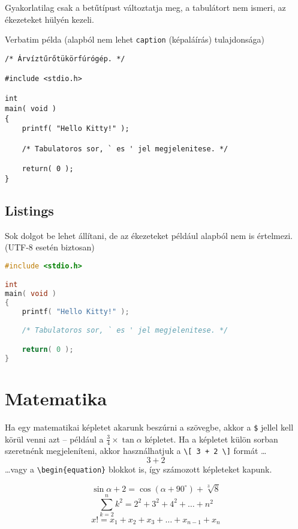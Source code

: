 \documentclass[a4paper]{report}             %
\begin{document}
Gyakorlatilag csak a betűtípust változtatja meg, a tabulátort nem ismeri, az
ékezeteket hülyén kezeli.

Verbatim példa (alapból nem lehet \verb"caption" (képaláírás) tulajdonsága)

\begin{verbatim}
/* Árvíztűrőtükörfúrógép. */

#include <stdio.h>

int
main( void )
{
    printf( "Hello Kitty!" );

	/* Tabulatoros sor, ` es ' jel megjelenitese. */

    return( 0 );
}
\end{verbatim}


\subsection{Listings}

Sok dolgot be lehet állítani, de az ékezeteket például alapból nem is
értelmezi. (UTF-8 esetén biztosan)

\begin{lstlisting}[language=C,caption={Listings példa},label=lst_pelda]
#include <stdio.h>

int
main( void )
{
    printf( "Hello Kitty!" );

	/* Tabulatoros sor, ` es ' jel megjelenitese. */

    return( 0 );
}
\end{lstlisting}


\section{Matematika}

Ha egy matematikai képletet akarunk beszúrni a szövegbe, akkor a \verb"$"
jellel kell körül venni azt -- például a $\frac{3}{4} \times \tan \alpha$
képletet. Ha a képletet külön sorban szeretnénk megjeleníteni, akkor
használhatjuk a \verb"\[ 3 + 2 \]" formát \dots
\[ 3 + 2 \]
\dots vagy a \verb!\begin{equation}! blokkot is, így számozott képleteket
kapunk.

\begin{equation}
    \sin \alpha + 2 = \cos ( \alpha + 90 ^{\circ} ) + \sqrt[3]{8}
\end{equation}
\begin{equation}
    \sum_{k=2}^n k^2 = 2^2 + 3^2 + 4^2 + \dots + n^2
\end{equation}
\begin{equation}
    x! = x_1 + x_2 + x_3 + \dots + x_{n-1} + x_{n}
\end{equation}
\end{document}

